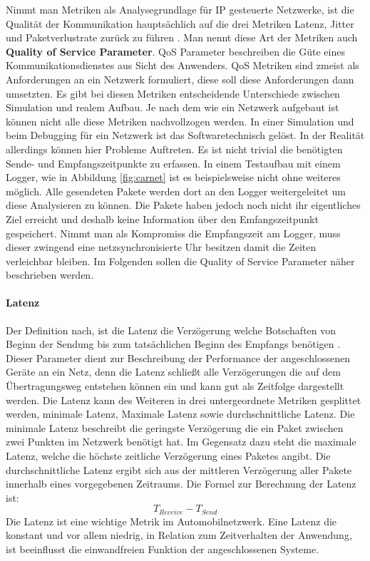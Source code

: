 \documentclass[draft=false
              ,paper=a4
              ,twoside=false
              ,fontsize=11pt
              ,headsepline
              ,BCOR10mm
              ,DIV11
              ]{scrbook}
\begin{document}
Nimmt man Metriken als Analysegrundlage für IP gesteuerte Netzwerke, ist die Qualität der Kommunikation hauptsächlich auf die drei Metriken Latenz, Jitter und Paketverlustrate zurück zu führen \cite{kempf_simulationsbasierte_2014} \cite{steinbach_metrik_2011}. Man nennt diese Art der Metriken auch \textbf{Quality of Service Parameter}. QoS Parameter beschreiben die Güte eines Kommunikationsdienstes aus Sicht des Anwenders. QoS Metriken sind zmeist als Anforderungen an ein Netzwerk formuliert, diese soll diese Anforderungen dann umsetzten. Es gibt bei diesen Metriken entscheidende Unterschiede zwischen Simulation und realem Aufbau. Je nach dem wie ein Netzwerk aufgebaut ist können nicht alle diese Metriken nachvollzogen werden. In einer Simulation und beim Debugging für ein Netzwerk ist das Softwaretechnisch gelöst. In der Realität allerdings können hier Probleme Auftreten. Es ist nicht trivial die benötigten Sende- und Empfangszeitpunkte zu erfassen. In einem Testaufbau mit einem Logger, wie in Abbildung \ref{fig:carnet} ist es beispielsweise nicht ohne weiteres möglich. Alle gesendeten Pakete werden dort an den Logger weitergeleitet um diese Analysieren zu können. Die Pakete haben jedoch noch nicht ihr eigentliches Ziel erreicht und deshalb keine Information über den Emfangszeitpunkt gespeichert. Nimmt man als Kompromiss die Empfangszeit am Logger, muss dieser zwingend eine netzsynchronisierte Uhr besitzen damit die Zeiten verleichbar bleiben. Im Folgenden sollen die Quality of Service Parameter näher beschrieben werden. 

\paragraph{Latenz} %
\label{par:Latenz}
Der Definition nach, ist die Latenz die Verzögerung welche Botschaften von Beginn der Sendung bis zum tatsächlichen Beginn des Empfangs benötigen \cite{reif_automobilelektronik:_2009}. Dieser Parameter dient zur Beschreibung der Performance der angeschlossenen Geräte an ein Netz, denn die Latenz schließt alle Verzögerungen die auf dem Übertragungsweg entstehen können ein und kann gut als Zeitfolge dargestellt werden. Die Latenz kann des Weiteren in drei untergeordnete Metriken gesplittet werden, minimale Latenz, Maximale Latenz sowie durchschnittliche Latenz. Die minimale Latenz beschreibt die geringste Verzögerung die ein Paket zwischen zwei Punkten im Netzwerk benötigt hat. Im Gegensatz dazu steht die maximale Latenz, welche die höchste zeitliche Verzögerung eines Paketes angibt. Die durchschnittliche Latenz ergibt sich aus der mittleren Verzögerung aller Pakete innerhalb eines vorgegebenen Zeitraums.
Die Formel zur Berechnung der Latenz ist:
\begin{equation}
  T_{Receive} - T_{Send}
\end{equation}
 Die Latenz ist eine wichtige Metrik im Automobilnetzwerk. Eine Latenz die konstant und vor allem niedrig, in Relation zum Zeitverhalten der Anwendung, ist beeinflusst die einwandfreien Funktion der angeschlossenen Systeme. 
\end{document}
